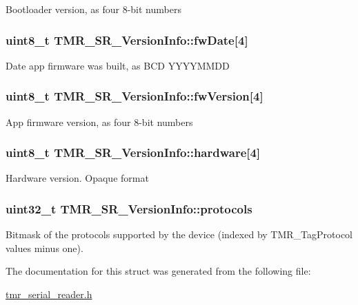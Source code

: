 Bootloader version, as four 8-bit numbers \hypertarget{struct_t_m_r___s_r___version_info_2d709234478b81deceafb90f8796e0d8}{
\subsubsection[{fwDate}]{\setlength{\rightskip}{0pt plus 5cm}uint8\_\-t {\bf TMR\_\-SR\_\-VersionInfo::fwDate}\mbox{[}4\mbox{]}}}
\label{struct_t_m_r___s_r___version_info_2d709234478b81deceafb90f8796e0d8}


Date app firmware was built, as BCD YYYYMMDD \hypertarget{struct_t_m_r___s_r___version_info_fc879979a4b2a3e7b96531ae830f472e}{
\subsubsection[{fwVersion}]{\setlength{\rightskip}{0pt plus 5cm}uint8\_\-t {\bf TMR\_\-SR\_\-VersionInfo::fwVersion}\mbox{[}4\mbox{]}}}
\label{struct_t_m_r___s_r___version_info_fc879979a4b2a3e7b96531ae830f472e}


App firmware version, as four 8-bit numbers \hypertarget{struct_t_m_r___s_r___version_info_91cc6cd1fd934b9027a1f33b826af38a}{
\subsubsection[{hardware}]{\setlength{\rightskip}{0pt plus 5cm}uint8\_\-t {\bf TMR\_\-SR\_\-VersionInfo::hardware}\mbox{[}4\mbox{]}}}
\label{struct_t_m_r___s_r___version_info_91cc6cd1fd934b9027a1f33b826af38a}


Hardware version. Opaque format \hypertarget{struct_t_m_r___s_r___version_info_61030bce2394948d99fb3d91bd5dba37}{
\subsubsection[{protocols}]{\setlength{\rightskip}{0pt plus 5cm}uint32\_\-t {\bf TMR\_\-SR\_\-VersionInfo::protocols}}}
\label{struct_t_m_r___s_r___version_info_61030bce2394948d99fb3d91bd5dba37}


Bitmask of the protocols supported by the device (indexed by TMR\_\-TagProtocol values minus one). 

The documentation for this struct was generated from the following file:\begin{CompactItemize}
\item 
\hyperlink{tmr__serial__reader_8h}{tmr\_\-serial\_\-reader.h}\end{CompactItemize}
